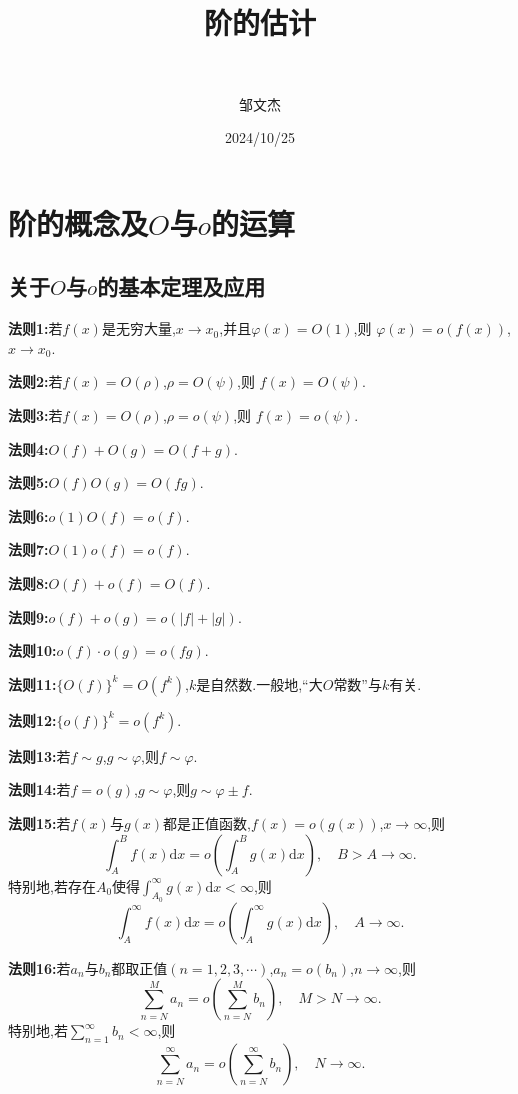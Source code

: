 \documentclass[lang=cn,newtx,10pt,scheme=chinese]{../Template/elegantbook}
\title{阶的估计}
\subtitle{\,\,}
\author{邹文杰}
\institute{无}
\date{2024/10/25}
\begin{document}
\maketitle
\frontmatter

\tableofcontents

\mainmatter%

\chapter{阶的概念及$O$与$o$的运算}

\section{关于$O$与$o$的基本定理及应用}

\begin{theorem}[$O$与$o$的基本运算法则]\label{$O$与$o$的基本运算法则}
\textbf{法则1:}若\(f(x)\)是无穷大量,\(x\to x_0\),并且\(\varphi(x)=O(1)\),则
\(\varphi(x)=o(f(x))\),\(x\to x_0\).

\textbf{法则2:}若\(f(x)=O(\rho)\),\(\rho = O(\psi)\),则
\(f(x)=O(\psi)\).

\textbf{法则3:}若\(f(x)=O(\rho)\),\(\rho = o(\psi)\),则
\(f(x)=o(\psi)\).

\textbf{法则4:}\(O(f)+O(g)=O(f + g)\).

\textbf{法则5:}\(O(f)O(g)=O(fg)\).

\textbf{法则6:}\(o(1)O(f)=o(f)\).

\textbf{法则7:}\(O(1)o(f)=o(f)\).

\textbf{法则8:}\(O(f)+o(f)=O(f)\).

\textbf{法则9:}\(o(f)+o(g)=o(|f|+|g|)\).

\textbf{法则10:}\(o(f)\cdot o(g)=o(fg)\).

\textbf{法则11:}\(\{O(f)\}^k = O(f^k)\),\(k\)是自然数.一般地,“大\(O\)常数”与\(k\)有关.

\textbf{法则12:}\(\{o(f)\}^k = o(f^k)\).

\textbf{法则13:}若\(f\sim g\),\(g\sim\varphi\),则\(f\sim\varphi\).

\textbf{法则14:}若\(f = o(g)\),\(g\sim\varphi\),则\(g\sim\varphi\pm f\).

\textbf{法则15:}若\(f(x)\)与\(g(x)\)都是正值函数,\(f(x)=o(g(x))\),\(x\to\infty\),则
\[
\int_{A}^{B}f(x)\mathrm{d}x = o\left(\int_{A}^{B}g(x)\mathrm{d}x\right),\quad B > A\to\infty.
\]
特别地,若存在\(A_0\)使得\(\int_{A_0}^{\infty}g(x)\mathrm{d}x<\infty\),则
\[
\int_{A}^{\infty}f(x)\mathrm{d}x = o\left(\int_{A}^{\infty}g(x)\mathrm{d}x\right),\quad A\to\infty.
\]

\textbf{法则16:}若\(a_n\)与\(b_n\)都取正值\((n = 1,2,3,\cdots)\),\(a_n=o(b_n)\),\(n\to\infty\),则
\[
\sum_{n = N}^{M}a_n = o\left(\sum_{n = N}^{M}b_n\right),\quad M > N\to\infty.
\]
特别地,若\(\sum_{n = 1}^{\infty}b_n<\infty\),则
\[
\sum_{n = N}^{\infty}a_n = o\left(\sum_{n = N}^{\infty}b_n\right),\quad N\to\infty.
\]
\end{theorem}
\end{document}
